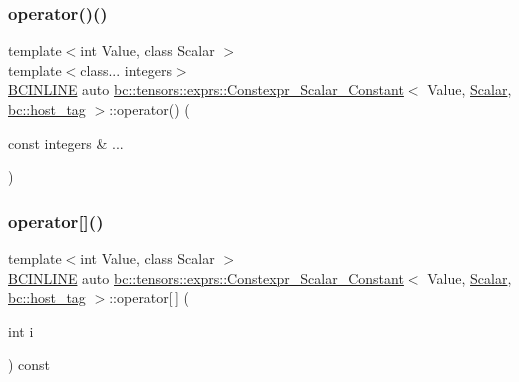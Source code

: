 \subsubsection{\texorpdfstring{operator()()}{operator()()}\hspace{0.1cm}{\footnotesize\ttfamily [2/2]}}
{\footnotesize\ttfamily template$<$int Value, class Scalar $>$ \\
template$<$class... integers$>$ \\
\hyperlink{common_8h_a6699e8b0449da5c0fafb878e59c1d4b1}{B\+C\+I\+N\+L\+I\+NE} auto \hyperlink{structbc_1_1tensors_1_1exprs_1_1Constexpr__Scalar__Constant}{bc\+::tensors\+::exprs\+::\+Constexpr\+\_\+\+Scalar\+\_\+\+Constant}$<$ Value, \hyperlink{namespacebc_aa12ac55ee2c43dc082894dd3859daee1}{Scalar}, \hyperlink{structbc_1_1host__tag}{bc\+::host\+\_\+tag} $>$\+::operator() (\begin{DoxyParamCaption}\item[{const integers \&}]{... }\end{DoxyParamCaption})\hspace{0.3cm}{\ttfamily [inline]}}

\mbox{\label{structbc_1_1tensors_1_1exprs_1_1Constexpr__Scalar__Constant_3_01Value_00_01Scalar_00_01bc_1_1host__tag_01_4_ad6abb1d18d59b8cfebd2fae1c8d3455e}} 
\subsubsection{\texorpdfstring{operator[]()}{operator[]()}\hspace{0.1cm}{\footnotesize\ttfamily [1/2]}}
{\footnotesize\ttfamily template$<$int Value, class Scalar $>$ \\
\hyperlink{common_8h_a6699e8b0449da5c0fafb878e59c1d4b1}{B\+C\+I\+N\+L\+I\+NE} auto \hyperlink{structbc_1_1tensors_1_1exprs_1_1Constexpr__Scalar__Constant}{bc\+::tensors\+::exprs\+::\+Constexpr\+\_\+\+Scalar\+\_\+\+Constant}$<$ Value, \hyperlink{namespacebc_aa12ac55ee2c43dc082894dd3859daee1}{Scalar}, \hyperlink{structbc_1_1host__tag}{bc\+::host\+\_\+tag} $>$\+::operator\mbox{[}$\,$\mbox{]} (\begin{DoxyParamCaption}\item[{int}]{i }\end{DoxyParamCaption}) const\hspace{0.3cm}{\ttfamily [inline]}}

